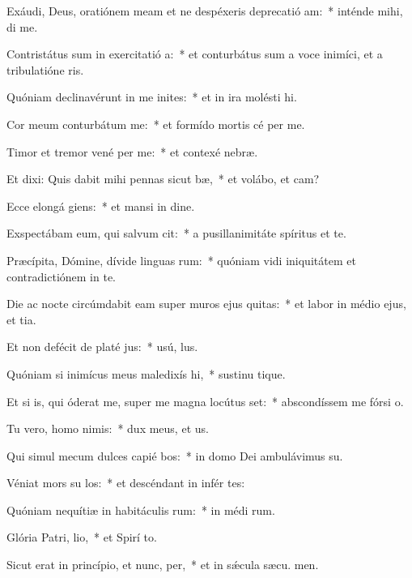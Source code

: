 \item Exáudi, Deus, oratiónem meam et ne despéxeris deprecatió am:~* inténde mihi,  di me.
\item Contristátus sum in exercitatió a:~* et conturbátus sum a voce inimíci, et a tribulatióne ris.
\item Quóniam declinavérunt in me inites:~* et in ira molésti  hi.
\item Cor meum conturbátum   me:~* et formído mortis cé per me.
\item Timor et tremor vené per me:~* et contexé  nebræ.
\item Et dixi: Quis dabit mihi pennas sicut bæ,~* et volábo, et cam?
\item Ecce elongá giens:~* et mansi in dine.
\item Exspectábam eum, qui salvum  cit:~* a pusillanimitáte spíritus et te.
\item Præcípita, Dómine, dívide linguas rum:~* quóniam vidi iniquitátem et contradictiónem in te.
\item Die ac nocte circúmdabit eam super muros ejus quitas:~* et labor in médio ejus, et tia.
\item Et non defécit de platé jus:~* usú,  lus.
\item Quóniam si inimícus meus maledixís hi,~* sustinu tique.
\item Et si is, qui óderat me, super me magna locútus set:~* abscondíssem me fórsi  o.
\item Tu vero, homo nimis:~* dux meus, et  us.
\item Qui simul mecum dulces capié bos:~* in domo Dei ambulávimus  su.
\item Véniat mors su los:~* et descéndant in infér tes:
\item Quóniam nequítiæ in habitáculis rum:~* in médi rum.
\item Glória Patri,  lio,~* et Spirí to.
\item Sicut erat in princípio, et nunc,  per,~* et in sǽcula sæcu. men.
